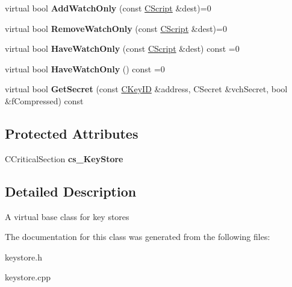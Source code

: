 \begin{DoxyCompactItemize}
\item 
\mbox{\label{class_c_key_store_a12cd4eaa01bd4f4231c0bf68425a44af}} 
virtual bool {\bfseries Add\+Watch\+Only} (const \mbox{\hyperlink{class_c_script}{C\+Script}} \&dest)=0
\item 
\mbox{\label{class_c_key_store_ad510747f28d129123a5200e4df8f7f61}} 
virtual bool {\bfseries Remove\+Watch\+Only} (const \mbox{\hyperlink{class_c_script}{C\+Script}} \&dest)=0
\item 
\mbox{\label{class_c_key_store_a15066cfd57feaffe0b9f4103c9311109}} 
virtual bool {\bfseries Have\+Watch\+Only} (const \mbox{\hyperlink{class_c_script}{C\+Script}} \&dest) const =0
\item 
\mbox{\label{class_c_key_store_a9169351f4acf62d299afb824174cbfa8}} 
virtual bool {\bfseries Have\+Watch\+Only} () const =0
\item 
\mbox{\label{class_c_key_store_a2b5581482aa2981cde91bd6da012b2de}} 
virtual bool {\bfseries Get\+Secret} (const \mbox{\hyperlink{class_c_key_i_d}{C\+Key\+ID}} \&address, C\+Secret \&vch\+Secret, bool \&f\+Compressed) const
\end{DoxyCompactItemize}
\subsection*{Protected Attributes}
\begin{DoxyCompactItemize}
\item 
\mbox{\label{class_c_key_store_a386524ff4a00959b81c195cb39fe307d}} 
C\+Critical\+Section {\bfseries cs\+\_\+\+Key\+Store}
\end{DoxyCompactItemize}


\subsection{Detailed Description}
A virtual base class for key stores 

The documentation for this class was generated from the following files\+:\begin{DoxyCompactItemize}
\item 
keystore.\+h\item 
keystore.\+cpp\end{DoxyCompactItemize}
